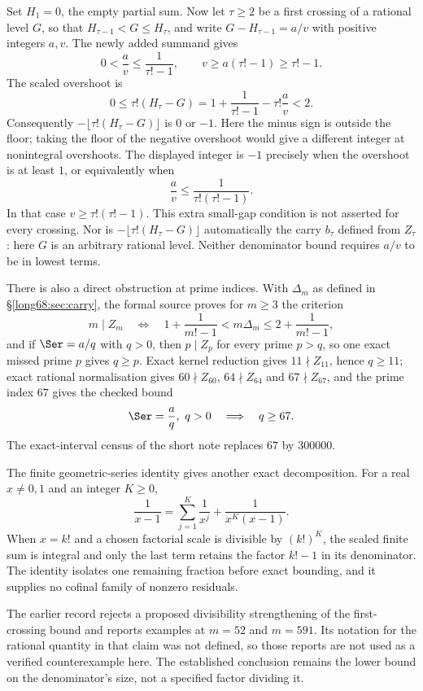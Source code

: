 Set $H_1=0$, the empty partial sum. Now let $\tau\ge2$ be a first
crossing of a rational level $G$, so that
$H_{\tau-1}<G\le H_\tau$, and write $G-H_{\tau-1}=a/v$ with positive
integers $a,v$. The newly added summand gives
\[
 0<\frac av\le\frac1{\tau!-1},
 \qquad v\ge a(\tau!-1)\ge\tau!-1.
\]
The scaled overshoot is
\[
 0\le\tau!(H_\tau-G)
 =1+\frac1{\tau!-1}-\tau!\frac av<2.
\]
Consequently $-\lfloor\tau!(H_\tau-G)\rfloor$ is $0$ or $-1$.
Here the minus sign is outside the floor; taking the floor of the negative
overshoot would give a different integer at nonintegral overshoots.
The displayed integer is $-1$ precisely when the overshoot is at least
$1$, or equivalently when
\[
 \frac av\le\frac1{\tau!(\tau!-1)}.
\]
In that case $v\ge\tau!(\tau!-1)$. This extra small-gap condition is not
asserted for every crossing. Nor is $-\lfloor\tau!(H_\tau-G)\rfloor$
automatically the carry $b_\tau$ defined from $Z_\tau$: here $G$ is an
arbitrary rational level. Neither denominator bound requires $a/v$ to be in lowest terms.

There is also a direct obstruction at prime indices. With $\Delta_m$ as
defined in \S\ref{long68:sec:carry}, the formal source proves for $m\ge3$
the criterion
\[
 m\mid Z_m
 \quad\Longleftrightarrow\quad
 1+\frac1{m!-1}<m\Delta_m\le2+\frac1{m!-1},
\]
and if $\Ser=a/q$ with $q>0$, then $p\mid Z_p$ for every prime $p>q$, so one
exact missed prime $p$ gives $q\ge p$.  Exact kernel reduction gives
$11\nmid Z_{11}$, hence $q\ge11$; exact rational normalisation gives
$60\nmid Z_{60}$, $64\nmid Z_{64}$ and $67\nmid Z_{67}$, and the prime index
$67$ gives the checked bound
\[
 \Ser=\frac aq,\ q>0\quad\Longrightarrow\quad q\ge67 .
\]
The exact-interval census of the short note replaces $67$ by $300000$.

The finite geometric-series identity gives another exact decomposition.  For a real $x\ne0,1$ and an integer $K\ge0$,
\[
 \frac1{x-1}=\sum_{j=1}^{K}\frac1{x^j}+\frac1{x^K(x-1)} .
\]
When $x=k!$ and a chosen factorial scale is divisible by $(k!)^K$, the scaled
finite sum is integral and only the last term retains the factor $k!-1$ in
its denominator.  The identity isolates one remaining fraction before exact
bounding, and it supplies no cofinal family of nonzero residuals.

The earlier record rejects a proposed divisibility strengthening of the
first-crossing bound and reports examples at $m=52$ and $m=591$. Its
notation for the rational quantity in that claim was not defined, so those
reports are not used as a verified counterexample here. The established
conclusion remains the lower bound on the denominator's size, not a
specified factor dividing it.

